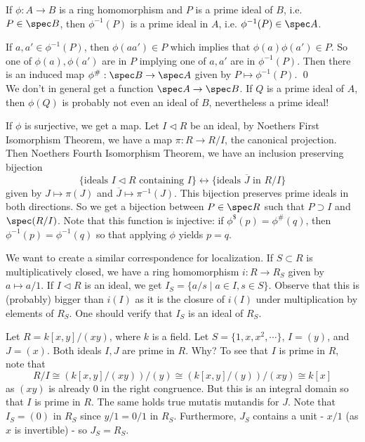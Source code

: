 \begin{prop}
If $\phi: A \to B$ is a ring homomorphism and $P$ is a prime ideal of $B$, i.e. $P \in \spec B$, then $\phi^{-1}(P)$ is a prime ideal in $A$, i.e. $\phi^{-1}(P) \in \spec A$. 
\end{prop}

\pf If $a,a' \in \phi^{-1}(P)$, then $\phi(aa') \in P$ which implies that $\phi(a)\phi(a') \in P$. So one of $\phi(a),\phi(a')$ are in $P$ implying one of $a,a'$ are in $\phi^{-1}(P)$. Then there is an induced map $\phi^{\#}: \spec B \to \spec A$ given by $P \mapsto \phi^{-1}(P)$. \qed \\

We don't in general get a function $\spec A \to \spec B$. If $Q$ is a prime ideal of $A$, then $\phi(Q)$ is probably not even an ideal of $B$, nevertheless a prime ideal!


\begin{rem}
If $\phi$ is surjective, we get a map. Let $I \lhd R$ be an ideal, by Noethers First Isomorphism Theorem, we have a map $\pi: R \to R/I$, the canonical projection. Then Noethers Fourth Isomorphism Theorem, we have an inclusion preserving bijection
	\[
	\{\text{ideals }I \lhd R \text{ containing }I \} \leftrightarrow \{\text{ideals }\overline{J} \text{ in }R/I \}
	\]
given by $J \mapsto \pi(J)$ and $\overline{J} \mapsto \pi^{-1}(J)$. This bijection preserves prime ideals in both directions. So we get a bijection between $P \in \spec R$ such that $P \supset I$ and $\spec(R/I)$. Note that this function is injective: if $\phi^{\$}(p)=\phi^{\#}(q)$, then $\phi^{-1}(p)=\phi^{-1}(q)$ so that applying $\phi$ yields $p=q$. 
\end{rem}

We want to create a similar correspondence for localization. If $S \subset R$ is multiplicatively closed, we have a ring homomorphism $i: R \to R_S$ given by $a \mapsto a/1$. If $I \lhd R$ is an ideal, we get $I_S=\{a/s \;|\; a \in I, s \in S\}$. Observe that this is (probably) bigger than $i(I)$ as it is the closure of $i(I)$ under multiplication by elements of $R_S$. One should verify that $I_S$ is an ideal of $R_S$. 

\begin{ex}
Let $R=k[x,y]/(xy)$, where $k$ is a field. Let $S=\{1,x,x^2,\cdots\}$, $I=(y)$, and $J=(x)$. Both ideals $I,J$ are prime in $R$. Why? To see that $I$ is prime in $R$, note that
\[
R/I \cong (k[x,y]/(xy))/(y) \cong (k[x,y]/(y))/(xy) \cong k[x]
\]
as $(xy)$ is already 0 in the right congruence. But this is an integral domain so that $I$ is prime in $R$. The same holds true mutatis mutandis for $J$. Note that $I_S=(0)$ in $R_S$ since $y/1=0/1$ in $R_S$. Furthermore, $J_S$ contains a unit - $x/1$ (as $x$ is invertible) - so $J_S=R_S$.
\end{ex}

